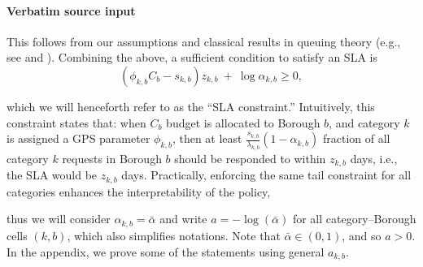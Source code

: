 \documentclass[10pt]{article}
\begin{document}
\paragraph{Verbatim source input}
\begin{ReviewVerbatim}
This follows from our assumptions and classical results in queuing theory (e.g., see \cite{kleinrock1975queue} and \cite{liu2001maximizing}). Combining the above, a sufficient condition to satisfy an SLA is
\begin{equation}
    (\phi_{k,b} C_b-{s_{k,b}})z_{k,b}
    \ +\ \log \alpha_{k,b}\geq0,
    \label{def:sla}
\end{equation}








  which we will henceforth refer to as the ``SLA constraint.'' Intuitively, this constraint states that: when $C_b$ budget is allocated to Borough $b$, and category $k$ is assigned a GPS parameter $\phi_{k,b}$, then at least $\frac{s_{k,b}}{\lambda_{k,b}}(1-\alpha_{k,b})$ fraction of all category $k$ requests in Borough $b$ should be {responded to} within $z_{k,b}$ days, i.e., the SLA would be $z_{k,b}$ days. Practically, enforcing the same tail constraint for all categories enhances the interpretability of the policy,

thus we will consider {$\alpha_{k,b}=\bar\alpha$ and write $a=-\log(\bar\alpha)$} for all category--Borough cells $(k,b)$, which also simplifies notations. Note that {$\bar\alpha\in(0,1)$}, and so {$a>0$}. In the appendix, we prove some of the statements using general $a_{k,b}$.
\end{ReviewVerbatim}
\end{document}
